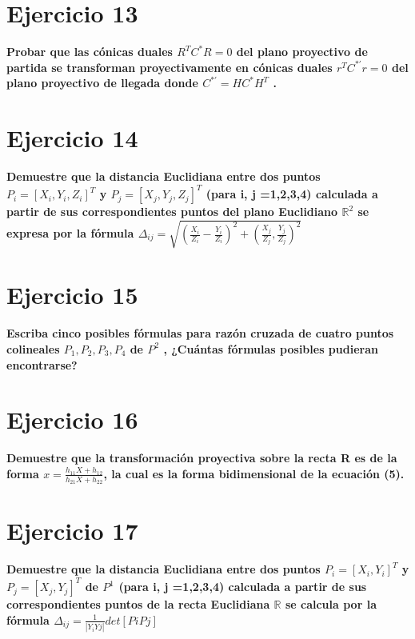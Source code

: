 \documentclass[12pt]{article}
\begin{document}
\section{Ejercicio 13}
\textbf{
Probar que las cónicas duales $R^{T}C^{*}R=0$ del plano proyectivo de partida se transforman proyectivamente en cónicas duales $r^{T}C^{*\prime}r =0$ del plano proyectivo de llegada donde $C^{*\prime}=HC^{*}H^{T}$ .
}


\section{Ejercicio 14}
\textbf{
Demuestre que la distancia Euclidiana entre dos puntos $P_{i}=[X_{i}, Y_{i}, Z_{i}]^{T}$ y $P_{j}=[X_{j}, Y_{j}, Z_{j}]^{T}$  (para i, j =1,2,3,4) calculada a partir de sus correspondientes puntos del plano Euclidiano  $\mathbb{R}^{2}$ se
expresa por la fórmula $\Delta_{ij} = \sqrt{ \left(\frac{X_{i}}{Z_{i}} - \frac{Y_{i}}{Z_{i}}\right)^{2} +  \left(\frac{X_{j}}{Z_{j}}, \frac{Y_{j}}{Z_{j}} \right)^{2}} $
}
\\


\section{Ejercicio 15}
\textbf{
Escriba cinco posibles fórmulas para razón cruzada de cuatro puntos colineales $P_{1},P_{2},P_{3},P_{4}$ de $P^{2}$ , ¿Cuántas fórmulas posibles pudieran encontrarse?
}
\\


\section{Ejercicio 16}


\textbf{
Demuestre que la transformación proyectiva sobre la recta R es de la forma $x=\frac{h_{11}X+h_{12}}{h_{21}X+h_{22}}$, la cual es la forma bidimensional de la ecuación (5).
}
\\



\section{Ejercicio 17}
\textbf{
Demuestre que la distancia Euclidiana entre dos puntos $P_{i}=[X_{i}, Y_{i}]^{T}$ y $P_{j}=[X_{j}, Y_{j}]^{T}$ de $P^{1}$ (para i, j =1,2,3,4) calculada a partir de sus correspondientes puntos de la recta Euclidiana $\mathbb{R}$ se calcula por la fórmula $\Delta_{ij} =  \frac{1}{|Y_{i}Y{j}|} det[P{i}P{j}]$
}
\\
\end{document}
